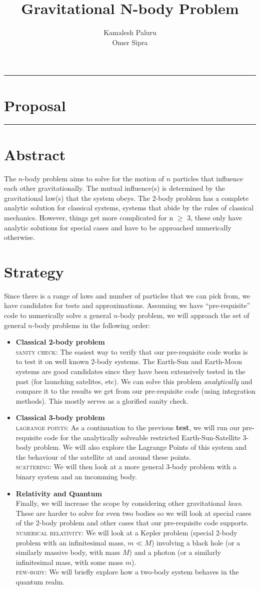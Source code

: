\documentclass[hidelinks, 11pt, dvipsnames]{article}
\title{Gravitational N-body Problem}
\author{Kamalesh Paluru \\ Omer Sipra}
\newcommand{\psection}[1]{{
    \begin{center}
        \noindent \rule{17cm}{0.4pt}
            \section*{\LARGE #1}
        \noindent \rule{17cm}{0.4pt}
    \end{center}
}}
\newcommand{\psubsection}[1]{
    \noindent 
    \section*{#1}
}
\begin{document}
\maketitle

\newpage

\psection{Proposal}

\psubsection{Abstract}
The $n$-body problem aims to solve for the motion of $n$ particles that influence each other gravitationally. The mutual influence(s) is determined by the gravitational law(s) that the system obeys. The 2-body problem has a complete analytic solution for classical systems, systems that abide by the rules of classical mechanics. However, things get more complicated for n $\ge$ 3, these only have analytic solutions for special cases and have to be approached numerically otherwise.

\psubsection{Strategy}
Since there is a range of laws and number of particles that we can pick from, we have candidates for tests and approximations. Assuming we have ``pre-requisite'' code to numerically solve a general $n$-body problem, we will approach the set of general $n$-body problems in the following order:
\begin{itemize}
    \item \textbf{Classical 2-body problem} \\ 
    \textsc{sanity check}: The easiest way to verify that our pre-requisite code works is to test it on well known 2-body systems. The Earth-Sun and Earth-Moon systems are good candidates since they have been extensively tested in the past (for launching satelites, etc). We can solve this problem \emph{analytically} and compare it to the results we get from our pre-requisite code (using integration methods). This mostly serves as a glorified sanity check.
    \item \textbf{Classical 3-body problem} \\ 
    \textsc{lagrange points}: As a continuation to the previous \textbf{test}, we will run our pre-requisite code for the analytically solveable restricted Earth-Sun-Satellite 3-body problem. We will also explore the Lagrange Points of this system and the behaviour of the satellite at and around these points. \\
    \textsc{scattering}: We will then look at a more general 3-body problem with a binary system and an incomming body.
    \item \textbf{Relativity and Quantum} \\
    Finally, we will increase the scope by considering other gravitational \emph{laws}. These are harder to solve for even two bodies so we will look at special cases of the 2-body problem and other cases that our pre-requisite code supports. \\
    \textsc{numerical relativity}: We will look at a Kepler problem (special 2-body problem with an infinitesimal mass, $m \ll M$) involving a black hole (or a similarly massive body, with mass $M$) and a photon (or a similarly infinitesimal mass, with some mass $m$). \\
    \textsc{few-body}: We will briefly explore how a two-body system behaves in the quantum realm. 
\end{itemize}
\end{document}
